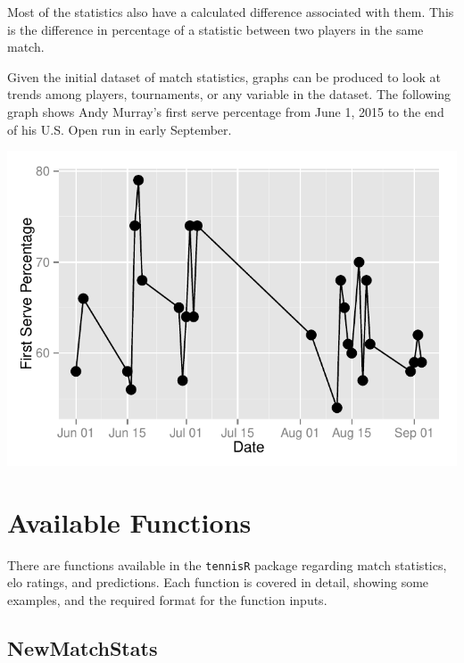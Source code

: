 \documentclass{article}\usepackage[]{graphicx}\usepackage[]{color}
\makeatletter
\def\maxwidth{ %
  \ifdim\Gin@nat@width>\linewidth
    \linewidth
  \else
    \Gin@nat@width
  \fi
}
\newenvironment{knitrout}{}{} %
\numberwithin{equation}{section} %
\newcommand{\pkg}[1]{{\texttt{#1}}}
\makeatother
\begin{document}
Most of the statistics also have a calculated difference associated with them.  This is the difference in percentage of a statistic between two players in the same match.

Given the initial dataset of match statistics, graphs can be produced to look at trends among players, tournaments, or any variable in the dataset.  The following graph shows Andy Murray's first serve percentage from June 1, 2015 to the end of his U.S. Open run in early September.

\begin{knitrout}
\color{fgcolor}

{\centering \includegraphics[width=\maxwidth]{figure/unnamed-chunk-5-1} 

}



\end{knitrout}

\section{Available Functions}

There are functions available in the \pkg{tennisR} package regarding match statistics, elo ratings, and predictions.  Each function is covered in detail, showing some examples, and the required format for the function inputs.

\subsection{NewMatchStats}
\end{document}
